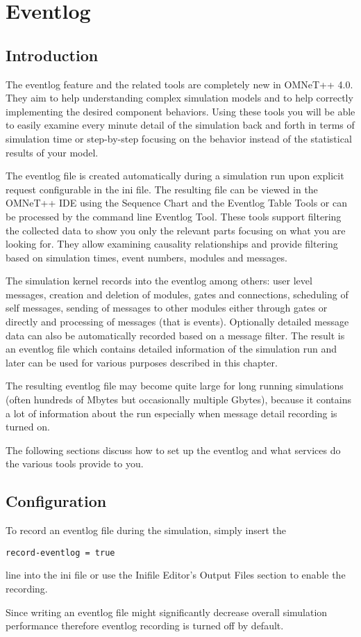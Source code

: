 \chapter{Eventlog}
\label{cha:eventlog}

\section{Introduction}
The eventlog feature and the related tools are completely new in OMNeT++ 4.0. They
aim to help understanding complex simulation models and to help correctly
implementing the desired component behaviors. Using these tools you will be able to
easily examine every minute detail of the simulation back and forth in terms of
simulation time or step-by-step focusing on the behavior instead of the statistical
results of your model.

The eventlog file is created automatically during a simulation run upon explicit
request configurable in the ini file. The resulting file can be viewed in the
OMNeT++ IDE using the Sequence Chart and the Eventlog Table Tools or can be
processed by the command line Eventlog Tool. These tools support filtering the
collected data to show you only the relevant parts focusing on what you are looking
for. They allow examining causality relationships and provide filtering based on
simulation times, event numbers, modules and messages.

The simulation kernel records into the eventlog among others: user level messages,
creation and deletion of modules, gates and connections, scheduling of self
messages, sending of messages to other modules either through gates or directly and
processing of messages (that is events). Optionally detailed message data can also
be automatically recorded based on a message filter. The result is an eventlog file
which contains detailed information of the simulation run and later can be used for
various purposes described in this chapter.

\begin{note}
The resulting eventlog file may become quite large for long running simulations
(often hundreds of Mbytes but occasionally multiple Gbytes), because it contains a
lot of information about the run especially when message detail recording is turned
on.
\end{note}

The following sections discuss how to set up the eventlog and what services do the
various tools provide to you.

\section{Configuration}
To record an eventlog file during the simulation, simply insert the
\begin{verbatim}
record-eventlog = true
\end{verbatim}
line into the ini file or use the Inifile Editor's Output Files section to enable
the recording.
\begin{note}
Since writing an eventlog file might significantly decrease overall simulation
performance therefore eventlog recording is turned off by default.
\end{note}

